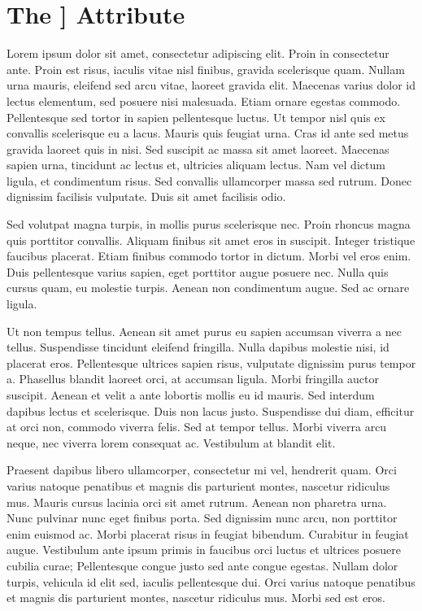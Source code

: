 \newpage
{}
\section[{\tt carries\_dependency}]{The {\SecCode [[carries\_dependency]]} Attribute}\label{carriesdependency}




Lorem ipsum dolor sit amet, consectetur adipiscing elit. Proin in consectetur ante. Proin est risus, iaculis vitae nisl finibus, gravida scelerisque quam. Nullam urna mauris, eleifend sed arcu vitae, laoreet gravida elit. Maecenas varius dolor id lectus elementum, sed posuere nisi malesuada. Etiam ornare egestas commodo. Pellentesque sed tortor in sapien pellentesque luctus. Ut tempor nisl quis ex convallis scelerisque eu a lacus. Mauris quis feugiat urna. Cras id ante sed metus gravida laoreet quis in nisi. Sed suscipit ac massa sit amet laoreet. Maecenas sapien urna, tincidunt ac lectus et, ultricies aliquam lectus. Nam vel dictum ligula, et condimentum risus. Sed convallis ullamcorper massa sed rutrum. Donec dignissim facilisis vulputate. Duis sit amet facilisis odio.

Sed volutpat magna turpis, in mollis purus scelerisque nec. Proin rhoncus magna quis porttitor convallis. Aliquam finibus sit amet eros in suscipit. Integer tristique faucibus placerat. Etiam finibus commodo tortor in dictum. Morbi vel eros enim. Duis pellentesque varius sapien, eget porttitor augue posuere nec. Nulla quis cursus quam, eu molestie turpis. Aenean non condimentum augue. Sed ac ornare ligula.

Ut non tempus tellus. Aenean sit amet purus eu sapien accumsan viverra a nec tellus. Suspendisse tincidunt eleifend fringilla. Nulla dapibus molestie nisi, id placerat eros. Pellentesque ultrices sapien risus, vulputate dignissim purus tempor a. Phasellus blandit laoreet orci, at accumsan ligula. Morbi fringilla auctor suscipit. Aenean et velit a ante lobortis mollis eu id mauris. Sed interdum dapibus lectus et scelerisque. Duis non lacus justo. Suspendisse dui diam, efficitur at orci non, commodo viverra felis. Sed at tempor tellus. Morbi viverra arcu neque, nec viverra lorem consequat ac. Vestibulum at blandit elit.

Praesent dapibus libero ullamcorper, consectetur mi vel, hendrerit quam. Orci varius natoque penatibus et magnis dis parturient montes, nascetur ridiculus mus. Mauris cursus lacinia orci sit amet rutrum. Aenean non pharetra urna. Nunc pulvinar nunc eget finibus porta. Sed dignissim nunc arcu, non porttitor enim euismod ac. Morbi placerat risus in feugiat bibendum. Curabitur in feugiat augue. Vestibulum ante ipsum primis in faucibus orci luctus et ultrices posuere cubilia curae; Pellentesque congue justo sed ante congue egestas. Nullam dolor turpis, vehicula id elit sed, iaculis pellentesque dui. Orci varius natoque penatibus et magnis dis parturient montes, nascetur ridiculus mus. Morbi sed est eros.

